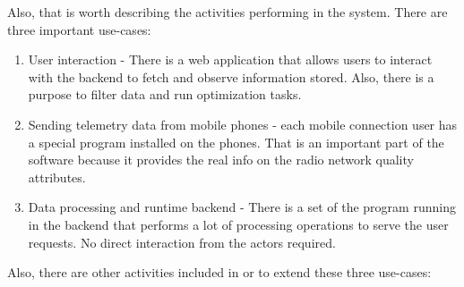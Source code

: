Also, that is worth describing the activities performing in the system.
There are three important use-cases:

\begin{enumerate}
\def\labelenumi{\arabic{enumi}.}
\tightlist
\item
  User interaction - There is a web application that allows users to
  interact with the backend to fetch and observe information stored.
  Also, there is a purpose to filter data and run optimization tasks.
\item
  Sending telemetry data from mobile phones - each mobile connection
  user has a special program installed on the phones. That is an
  important part of the software because it provides the real info on
  the radio network quality attributes.
\item
  Data processing and runtime backend - There is a set of the program
  running in the backend that performs a lot of processing operations to
  serve the user requests. No direct interaction from the actors
  required.
\end{enumerate}

Also, there are other activities included in or to extend these three
use-cases:

